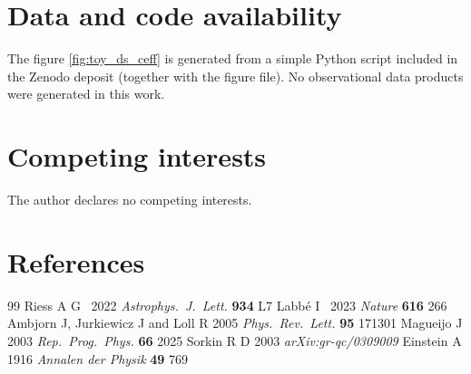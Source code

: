 \documentclass[12pt]{iopart}
\begin{document}
\section*{Data and code availability}
The figure \ref{fig:toy_ds_ceff} is generated from a simple Python script included in the Zenodo deposit (together with the figure file). No observational data products were generated in this work.

\section*{Competing interests}
The author declares no competing interests.

\section*{References}
\begin{thebibliography}{99}
 Riess A G \etal\ 2022 \textit{Astrophys.\ J.\ Lett.} \textbf{934} L7
 Labb\'e I \etal\ 2023 \textit{Nature} \textbf{616} 266
 Ambjorn J, Jurkiewicz J and Loll R 2005 \textit{Phys.\ Rev.\ Lett.} \textbf{95} 171301
 Magueijo J 2003 \textit{Rep.\ Prog.\ Phys.} \textbf{66} 2025
 Sorkin R D 2003 \textit{arXiv:gr-qc/0309009}
 Einstein A 1916 \textit{Annalen der Physik} \textbf{49} 769
\end{thebibliography}
\end{document}
